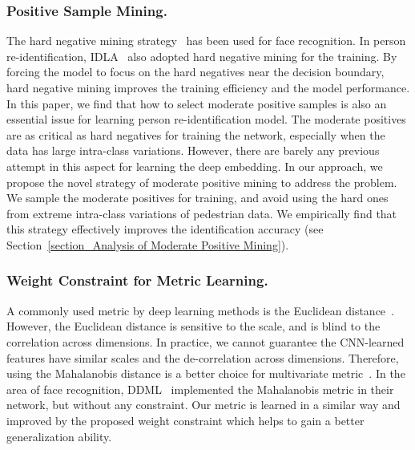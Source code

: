 \documentclass[runningheads]{llncs}
\begin{document}
\subsubsection{Positive Sample Mining.}
The hard negative mining strategy~\cite{schroff2015facenet} has been used for face recognition.
In person re-identification, IDLA~\cite{ahmed2015improved} also adopted hard negative mining for the training.
By forcing the model to focus on the hard negatives near the decision boundary, hard negative mining improves the training efficiency and the model performance.
In this paper, we find that how to select moderate positive samples is also an essential issue for learning person re-identification model.
The moderate positives are as critical as hard negatives for training the network, especially when the data has large intra-class variations.
However, there are barely any previous attempt in this aspect for learning the deep embedding.
In our approach, we propose the novel strategy of moderate positive mining to address the problem.
We sample the moderate positives for training, and avoid using the hard ones from extreme intra-class variations of pedestrian data.
We empirically find that this strategy effectively improves the identification accuracy (see Section~\ref{section_Analysis of Moderate Positive Mining}).

\subsubsection{Weight Constraint for Metric Learning.}
A commonly used metric by deep learning methods is the Euclidean distance~\cite{ding2015deep,schroff2015facenet,parkhi2015deep}.
However, the Euclidean distance is sensitive to the scale, and is blind to the correlation across dimensions.
In practice, we cannot guarantee the CNN-learned features have similar scales and the de-correlation across dimensions.
Therefore, using the Mahalanobis distance is a better choice for multivariate metric~\cite{manly2004multivariate}.
In the area of face recognition, DDML~\cite{hu2014discriminative} implemented the Mahalanobis metric in their network, but without any constraint.
Our metric is learned in a similar way and improved by the proposed weight constraint which helps to gain a better generalization ability.
\end{document}
